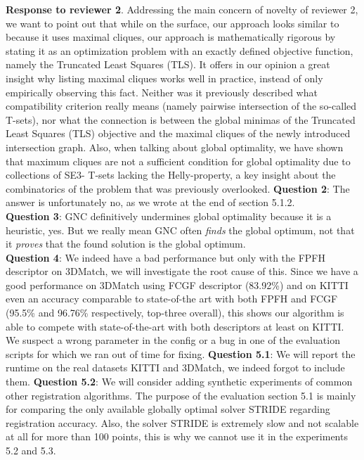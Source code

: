 \documentclass[10pt,twocolumn,letterpaper]{article}
\begin{document}
\textbf{Response to reviewer 2}.
Addressing the main concern of novelty of reviewer 2, we want to point out that while on the surface, our approach looks similar to \cite{zhang20233d} because it uses maximal cliques, our approach is mathematically rigorous by stating it as an optimization problem with an exactly defined objective function, namely the Truncated Least Squares (TLS). It offers in our opinion a great insight why listing maximal cliques works well in practice, instead of only empirically observing this fact. Neither was it previously described what compatibility criterion really means (namely pairwise intersection of the so-called T-sets),
nor what the connection is between the global minimas of the Truncated Least Squares (TLS) objective and the maximal cliques of the newly introduced intersection graph. Also, when talking about global optimality, we have shown that maximum cliques are not a sufficient condition for global optimality due to collections of SE3- T-sets lacking the Helly-property, a key insight about the combinatorics of the problem that was previously overlooked.
\textbf{Question 2}: The answer is unfortunately no, as we wrote at the end of section 5.1.2.\\
\textbf{Question 3}: GNC definitively undermines global optimality because it is a heuristic, yes. But we really mean GNC often \textit{finds} the global optimum, not that it \textit{proves} that the found solution is the global optimum.\\
\textbf{Question 4}: We indeed have a bad performance but only with the FPFH descriptor on 3DMatch, we will investigate the root cause of this. Since we have a good performance on 3DMatch using FCGF descriptor (83.92\%) and on KITTI even an accuracy comparable to state-of-the art with both FPFH and FCGF (95.5\% and 96.76\% respectively, top-three overall), this shows our algorithm is able to compete with state-of-the-art with both descriptors at least on KITTI. We suspect a wrong parameter in the config or a bug in one of the evaluation scripts for which we ran out of time for fixing. \textbf{Question 5.1}: We will report the runtime on the real datasets KITTI and 3DMatch, we indeed forgot to include them. \textbf{Question 5.2}: We will consider adding synthetic experiments of common other registration algorithms. The purpose of the evaluation section 5.1 is mainly for comparing the only available globally optimal solver STRIDE regarding registration accuracy. Also, the solver STRIDE is extremely slow and not scalable at all for more than 100 points, this is why we cannot use it in the experiments 5.2 and 5.3.
\end{document}
